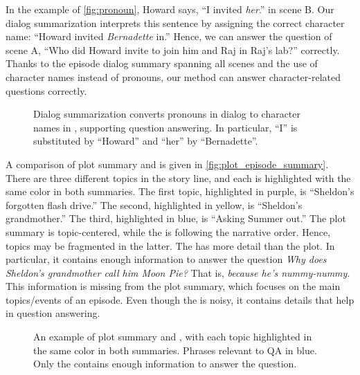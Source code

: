 \documentclass[10pt,twocolumn,letterpaper]{article}
\makeatletter
\renewcommand\paragraph{\@startsection{paragraph}{4}{\z@}{1ex}{-1em}{\normalfont\normalsize\bfseries}}
\makeatother
\begin{document}
In the example of \autoref{fig:pronoun}, Howard says, ``I invited \emph{her}.'' in scene B. Our dialog summarization interprets this sentence by assigning the correct character name: ``Howard invited \emph{Bernadette} in.'' Hence, we can answer the question of scene A, ``Who did Howard invite to join him and Raj in Raj's lab?'' correctly. Thanks to the episode dialog summary spanning all scenes and the use of character names instead of pronouns, our method can answer character-related questions correctly.

\begin{figure}[ht!]
\centering
{}
\caption{Dialog summarization converts pronouns in dialog to character names in \episodeSum, supporting question answering. In particular, ``I'' is substituted by ``Howard'' and ``her'' by ``Bernadette''.}
\label{fig:pronoun}
\end{figure}




\paragraph{Plot \vs \episodeSum}

A comparison of plot summary and \episodeSum is given in \autoref{fig:plot_episode_summary}. There are three different topics in the story line, and each is highlighted with the same color in both summaries. The first topic, highlighted in purple, is ``Sheldon's forgotten flash drive.''  The second, highlighted in yellow, is ``Sheldon's grandmother.'' The third, highlighted in blue, is ``Asking Summer out.'' The plot summary is topic-centered, while the \episodeSum is following the narrative order. Hence, topics may be fragmented in the latter. The \episodeSum has more detail than the plot. In particular, it contains enough information to answer the question \emph{Why does Sheldon's grandmother call him Moon Pie?} That is, \emph{because he's nummy-nummy}. This information is missing from the plot summary, which focuses on the main topics/events of an episode. Even though the \episodeSum is noisy, it contains details that help in question answering.
\begin{figure}[h]
\centering
\caption{An example of plot summary and \episodeSum, with each topic highlighted in the same color in both summaries. Phrases relevant to QA in blue. Only the \episodeSum contains enough information to answer the question.}
\label{fig:plot_episode_summary}
\end{figure}
\end{document}
